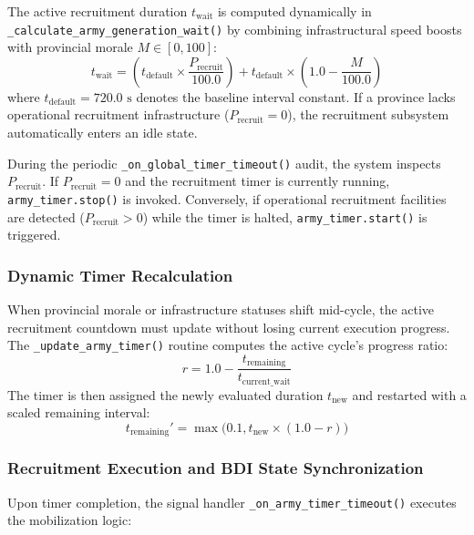 The active recruitment duration $t_{\text{wait}}$ is computed dynamically in \texttt{\_calculate\_army\_generation\_wait()} by combining infrastructural speed boosts with provincial morale $M \in [0, 100]$:
\begin{equation}
    t_{\text{wait}} = \left(t_{\text{default}} \times \frac{P_{\text{recruit}}}{100.0}\right) + t_{\text{default}} \times \left(1.0 - \frac{M}{100.0}\right)
\end{equation}
where $t_{\text{default}} = 720.0\text{ s}$ denotes the baseline interval constant. If a province lacks operational recruitment infrastructure ($P_{\text{recruit}} = 0$), the recruitment subsystem automatically enters an idle state.

During the periodic \texttt{\_on\_global\_timer\_timeout()} audit, the system inspects $P_{\text{recruit}}$. If $P_{\text{recruit}} = 0$ and the recruitment timer is currently running, \texttt{army\_timer.stop()} is invoked. Conversely, if operational recruitment facilities are detected ($P_{\text{recruit}} > 0$) while the timer is halted, \texttt{army\_timer.start()} is triggered.

\subsubsection{Dynamic Timer Recalculation}
When provincial morale or infrastructure statuses shift mid-cycle, the active recruitment countdown must update without losing current execution progress. The \texttt{\_update\_army\_timer()} routine computes the active cycle's progress ratio:
\begin{equation}
    r = 1.0 - \frac{t_{\text{remaining}}}{t_{\text{current\_wait}}}
\end{equation}
The timer is then assigned the newly evaluated duration $t_{\text{new}}$ and restarted with a scaled remaining interval:
\begin{equation}
    t_{\text{remaining}}' = \max\Big(0.1, t_{\text{new}} \times (1.0 - r)\Big)
\end{equation}

\subsubsection{Recruitment Execution and BDI State Synchronization}
Upon timer completion, the signal handler \texttt{\_on\_army\_timer\_timeout()} executes the mobilization logic:

